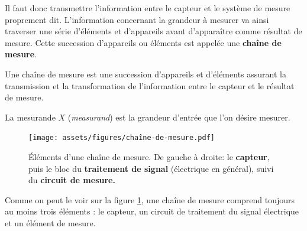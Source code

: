 Il faut donc transmettre l'information entre le capteur et le système de mesure proprement dit. L'information concernant la grandeur à mesurer va ainsi traverser une série d'éléments et d'appareils avant d'apparaître comme résultat de mesure. Cette succession d'appareils ou éléments est appelée une \textbf{chaîne de mesure}.

\begin{definition}
    Une chaîne de mesure est une succession d'appareils et d'éléments assurant la transmission et la transformation de l'information entre le capteur et le résultat de mesure.
\end{definition}

\begin{definition}
    La mesurande $X$ (\emph{measurand}) est la grandeur d'entrée que l'on désire mesurer.
\end{definition}

\begin{figure}[ht]
    \centering
    \vspace{-5mm}
    \texttt{[image: assets/figures/chaîne-de-mesure.pdf]}
    \caption{Éléments d'une chaîne de mesure. De gauche à droite: le \textbf{capteur}, puis le bloc du \textbf{traitement de signal} (électrique en général), suivi du \textbf{circuit de mesure.}}
    \label{fig:chaine_de_mesure}
\end{figure}
Comme on peut le voir sur la figure \ref{fig:chaine_de_mesure}, une chaîne de mesure comprend toujours au moins trois éléments : le capteur, un circuit de traitement du signal électrique et un élément de mesure.

